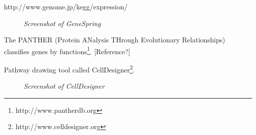 http://www.genome.jp/kegg/expression/


\begin{figure}[ht]
\centering
{} 
\caption[Screenshot of GeneSpring]{\textit{Screenshot of GeneSpring}} 
\label{gfx:screenshot_gene_spring}
\end{figure}


The PANTHER (Protein ANalysis THrough Evolutionary Relationships) classifies genes by functions\footnote{http://www.pantherdb.org}.
[Reference?]

Pathway drawing tool called CellDesigner\footnote{http://www.celldesigner.org}.

\begin{figure}[ht]
\centering
{} 
\caption[Screenshot of CellDesigner]{\textit{Screenshot of CellDesigner}} 
\label{gfx:screenshot_cell_designer}
\end{figure}

